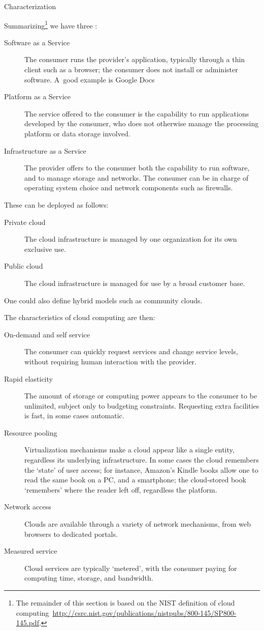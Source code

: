  {Characterization}

Summarizing\footnote{The remainder of this section is based on the
  NIST definition of cloud
  computing~\url{http://csrc.nist.gov/publications/nistpubs/800-145/SP800-145.pdf}.}
we have three :
\begin{description}
  \item[Software as a Service] The consumer runs the provider's
    application, typically through a thin client such as a browser;
    the consumer does not install or administer software.
    A~good example is Google Docs
\item[Platform as a Service] The service offered to the consumer is
  the capability to run applications developed by the consumer, who
  does not otherwise manage the processing platform or data storage
  involved.
\item[Infrastructure as a Service] The provider offers to the consumer
  both the capability to run software, and to manage storage and
  networks. The consumer can be in charge of operating system choice
  and network components such as firewalls.
\end{description}
These can be deployed as follows:
\begin{description}
  \item[Private cloud] The cloud infrastructure is managed by one organization for its own exclusive use.
  \item[Public cloud] The cloud infrastructure is managed for use by a broad customer base.
\end{description}
One could also define hybrid models such as community clouds.

The characteristics of cloud computing are then:
\begin{description}
  \item[On-demand and self service] The consumer can quickly request services
    and change service levels, without requiring human interaction with the provider.
  \item[Rapid elasticity] The amount of storage or computing power appears to the consumer
    to be unlimited, subject only to budgeting constraints. Requesting extra facilities
    is fast, in some cases automatic.
  \item[Resource pooling] Virtualization mechanisms make a cloud
    appear like a single entity, regardless its underlying
    infrastructure. In some cases the cloud remembers the `state' of
    user access; for instance, Amazon's Kindle books allow one to read
    the same book on a PC, and a smartphone; the cloud-stored book
    `remembers' where the reader left off, regardless the platform.
  \item[Network access] Clouds are available through a variety of
    network mechanisms, from web browsers to dedicated portals.
  \item[Measured service] Cloud services are typically `metered', with the consumer
    paying for computing time, storage, and bandwidth.
\end{description}

